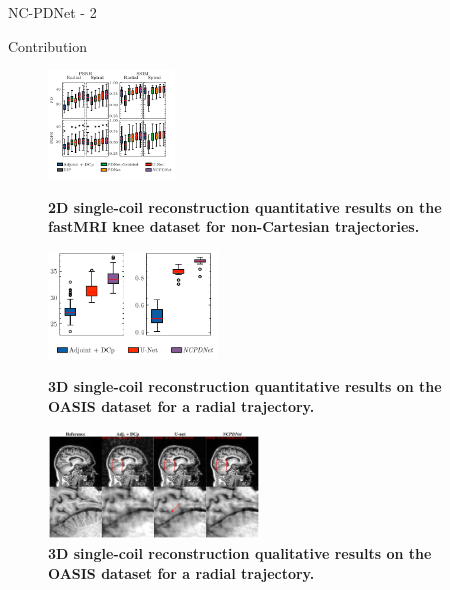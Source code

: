 \begin{frame}{NC-PDNet - 2}
    \begin{exampleblock}{Contribution}
    \end{exampleblock}

    \begin{figure}
        \begin{overprint}
            \centering\includegraphics[width=0.3\textwidth]{Figures/dl_mri_figures/single_coil.pdf}\caption{\textbf{2D single-coil reconstruction quantitative results on the fastMRI knee dataset for non-Cartesian trajectories.}}
            \centering\includegraphics[width=0.4\textwidth]{Figures/dl_mri_figures/3d.pdf}\caption{\textbf{3D single-coil reconstruction quantitative results on the OASIS dataset for a radial trajectory.}}
            \centering\includegraphics[width=0.5\textwidth]{Figures/dl_mri_figures/quali_no_err_3d_af4_radial.pdf}\caption{\textbf{3D single-coil reconstruction qualitative results on the OASIS dataset for a radial trajectory.}}
        \end{overprint}
    \end{figure}
\end{frame}

